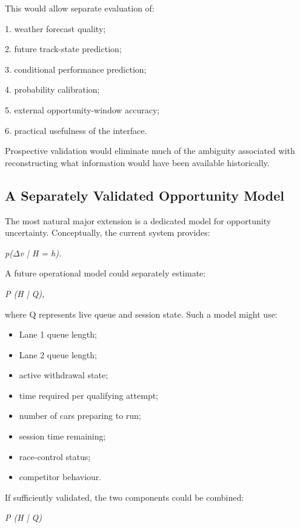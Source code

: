 This would allow separate evaluation of:

1. weather forecast quality;

2. future track-state prediction;

3. conditional performance prediction;

4. probability calibration;

5. external opportunity-window accuracy;

6. practical usefulness of the interface.

Prospective validation would eliminate much of the ambiguity associated with reconstructing what information would have been available historically.

\subsection{A Separately Validated Opportunity Model}
The most natural major extension is a dedicated model for opportunity uncertainty. Conceptually, the current system provides:

\begin{center}\textit{p(\ensuremath{\Delta}v | H = h).}\end{center}

A future operational model could separately estimate:

\begin{center}\textit{P (H | Q),}\end{center}

where Q represents live queue and session state. Such a model might use:

\begin{itemize}
\item Lane 1 queue length;
\item Lane 2 queue length;
\item active withdrawal state;
\item time required per qualifying attempt;
\item number of cars preparing to run;
\item session time remaining;
\item race-control status;
\item competitor behaviour.
\end{itemize}

If sufficiently validated, the two components could be combined:

\begin{center}\textit{P (H | Q)}\end{center}

